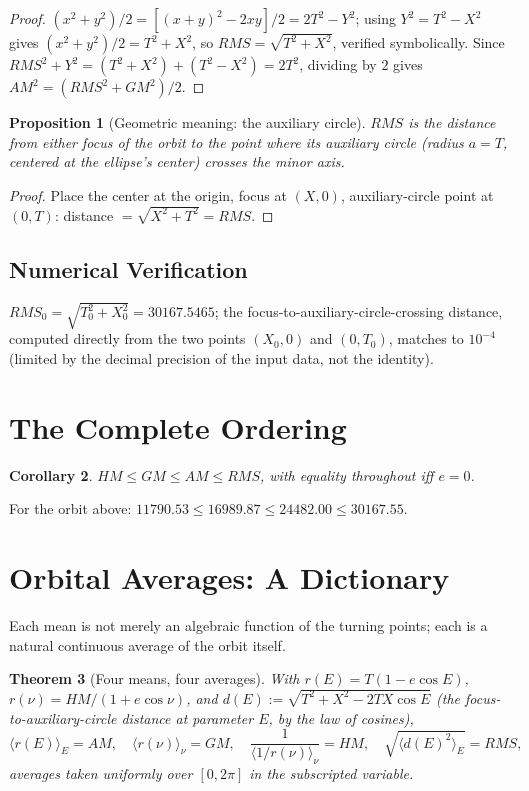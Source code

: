 \documentclass[12pt]{amsart}
\theoremstyle{plain}
\newtheorem{theorem}{Theorem}[section]
\newtheorem{proposition}[theorem]{Proposition}
\newtheorem{corollary}[theorem]{Corollary}
\theoremstyle{remark}
\begin{document}
\begin{proof}
$(x^2+y^2)/2=[(x+y)^2-2xy]/2=2T^2-Y^2$; using $Y^2=T^2-X^2$ gives $(x^2+y^2)/2=T^2+X^2$, so $RMS=\sqrt{T^2+X^2}$, verified symbolically. Since $RMS^2+Y^2=(T^2+X^2)+(T^2-X^2)=2T^2$, dividing by $2$ gives $AM^2=(RMS^2+GM^2)/2$.
\end{proof}

\begin{proposition}[Geometric meaning: the auxiliary circle]\label{prop:auxcircle}
$RMS$ is the distance from either focus of the orbit to the point where its auxiliary circle (radius $a=T$, centered at the ellipse's center) crosses the minor axis.
\end{proposition}

\begin{proof}
Place the center at the origin, focus at $(X,0)$, auxiliary-circle point at $(0,T)$: distance $=\sqrt{X^2+T^2}=RMS$.
\end{proof}

\subsection*{Numerical Verification}
$RMS_0=\sqrt{T_0^2+X_0^2}=30167.5465$; the focus-to-auxiliary-circle-crossing distance, computed directly from the two points $(X_0,0)$ and $(0,T_0)$, matches to $10^{-4}$ (limited by the decimal precision of the input data, not the identity).

\section{The Complete Ordering}

\begin{corollary}
$HM\le GM\le AM\le RMS$, with equality throughout iff $e=0$.
\end{corollary}
For the orbit above: $11790.53\le16989.87\le24482.00\le30167.55$.

\section{Orbital Averages: A Dictionary}

Each mean is not merely an algebraic function of the turning points; each is a natural continuous average of the orbit itself.

\begin{theorem}[Four means, four averages]\label{thm:averages}
With $r(E)=T(1-e\cos E)$, $r(\nu)=HM/(1+e\cos\nu)$, and $d(E):=\sqrt{T^2+X^2-2TX\cos E}$ (the focus-to-auxiliary-circle distance at parameter $E$, by the law of cosines),
\begin{equation}
\langle r(E)\rangle_E=AM,\quad \langle r(\nu)\rangle_\nu=GM,\quad \frac{1}{\langle 1/r(\nu)\rangle_\nu}=HM,\quad \sqrt{\langle d(E)^2\rangle_E}=RMS, \tag{1}
\end{equation}
averages taken uniformly over $[0,2\pi]$ in the subscripted variable.
\end{theorem}
\end{document}
